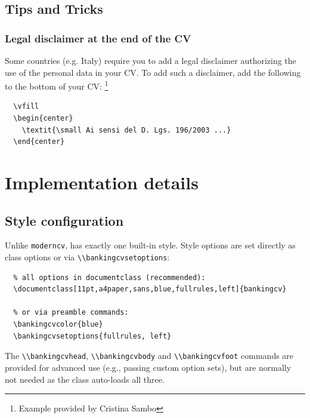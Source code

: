\documentclass[a4paper, 11pt]{article}
\newcommand{\code}[1]{\lstinline!#1!}
\newcommand{\moderncv}{\code{moderncv}}
\begin{document}
\subsection{Tips and Tricks}
\subsubsection{Legal disclaimer at the end of the CV}
Some countries (e.g. Italy) require you to add a legal disclaimer authorizing the use of the personal data in your CV.
To add such a disclaimer, add the following to the bottom of your CV:%
\footnote{Example provided by Cristina Sambo}%
\begin{lstlisting}
  \vfill
  \begin{center}
    \textit{\small Ai sensi del D. Lgs. 196/2003 ...}
  \end{center}
\end{lstlisting}



\section{Implementation details}
\label{section:implementationDetails}

\subsection{Style configuration}
\label{section:implementationDetails:styleConfiguration}
Unlike \moderncv, {\bankingcv} has exactly one built-in style. Style options are set directly as class options or via \code{\\bankingcvsetoptions}:

\begin{lstlisting}
  % all options in documentclass (recommended):
  \documentclass[11pt,a4paper,sans,blue,fullrules,left]{bankingcv}

  % or via preamble commands:
  \bankingcvcolor{blue}
  \bankingcvsetoptions{fullrules, left}
\end{lstlisting}
\noindent The \code{\\bankingcvhead}, \code{\\bankingcvbody} and \code{\\bankingcvfoot} commands are provided for advanced use (e.g., passing custom option sets), but are normally not needed as the class auto-loads all three.
\end{document}
